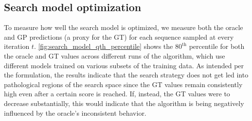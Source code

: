 \documentclass{article}
\begin{document}
\subsection{Search model optimization}
\label{sec:appendix-search_model_opt}
To measure how well the search model is optimized, we measure both the oracle
and GP predictions (a proxy for the GT) for each sequence sampled at every
iteration $t$. \cref{fig:search_model_qth_percentile} shows the $80^{\text{th}}$
percentile for both the oracle and GT values across different runs of the
algorithm, which use different models trained on various subsets of the training
data. As intended per the formulation, the results indicate that the search
strategy does not get led into pathological regions of the search space since
the GT values remain consistently high even after a certain score is reached.
If, instead, the GT values were to decrease substantially, this would indicate
that the algorithm is being negatively influenced by the oracle's inconsistent
behavior.
\end{document}
